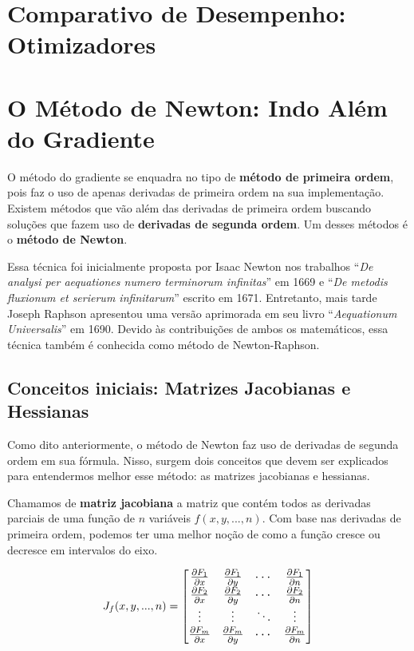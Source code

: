 \section{Comparativo de Desempenho: Otimizadores}


\section{O Método de Newton: Indo Além do Gradiente}

O método do gradiente se enquadra no tipo de \textbf{método de primeira ordem}, pois faz o uso de apenas derivadas de primeira ordem na sua implementação. Existem métodos que vão além das derivadas de primeira ordem buscando soluções que fazem uso de \textbf{derivadas de segunda ordem}. Um desses métodos é o \textbf{método de Newton}.

Essa técnica foi inicialmente proposta por Isaac Newton nos trabalhos “\textit{De analysi per aequationes numero terminorum infinitas}” em 1669 e “\textit{De metodis fluxionum et serierum infinitarum}” escrito em 1671. Entretanto, mais tarde Joseph Raphson apresentou uma versão aprimorada em seu livro “\textit{Aequationum Universalis}” em 1690. Devido às contribuições de ambos os matemáticos, essa técnica também é conhecida como método de Newton-Raphson.

\subsection{Conceitos iniciais: Matrizes Jacobianas e Hessianas}

Como dito anteriormente, o método de Newton faz uso de derivadas de segunda ordem em sua fórmula. Nisso, surgem dois conceitos que devem ser explicados para entendermos melhor esse método: as matrizes jacobianas e hessianas.

Chamamos de \textbf{matriz jacobiana} a matriz que contém todos as derivadas parciais de uma função de $n$ variáveis $f(x, y, ..., n)$. Com base nas derivadas de primeira ordem, podemos ter uma melhor noção de como a função cresce ou decresce em intervalos do eixo.

    \begin{equation}
        \large J_f(x,y,...,n) =
        \begin{bmatrix}
        \frac{\partial F_1}{\partial x} & \frac{\partial F_1}{\partial y} & \cdots & \frac{\partial F_1}{\partial n} \\
        \frac{\partial F_2}{\partial x} & \frac{\partial F_2}{\partial y} & \cdots & \frac{\partial F_2}{\partial n} \\
        \vdots & \vdots & \ddots & \vdots \\
        \frac{\partial F_m}{\partial x} & \frac{\partial F_m}{\partial y} & \cdots & \frac{\partial F_m}{\partial n}
        \end{bmatrix}
    \end{equation}

